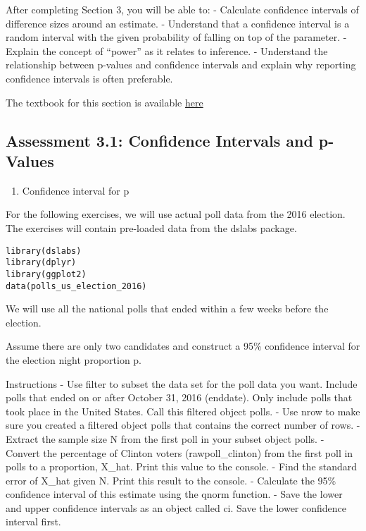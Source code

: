 \documentclass[
]{article}
\providecommand{\tightlist}{%
  \setlength{\itemsep}{0pt}\setlength{\parskip}{0pt}}
\begin{document}
After completing Section 3, you will be able to: - Calculate confidence
intervals of difference sizes around an estimate. - Understand that a
confidence interval is a random interval with the given probability of
falling on top of the parameter. - Explain the concept of ``power'' as
it relates to inference. - Understand the relationship between p-values
and confidence intervals and explain why reporting confidence intervals
is often preferable.

The textbook for this section is available
\href{https://rafalab.github.io/dsbook/inference.html\#confidence-intervals}{here}

\hypertarget{assessment-3.1-confidence-intervals-and-p-values}{%
\subsection{Assessment 3.1: Confidence Intervals and
p-Values}\label{assessment-3.1-confidence-intervals-and-p-values}}

\begin{enumerate}
\def\labelenumi{\arabic{enumi}.}
\tightlist
\item
  Confidence interval for p
\end{enumerate}

For the following exercises, we will use actual poll data from the 2016
election. The exercises will contain pre-loaded data from the dslabs
package.

\begin{verbatim}
library(dslabs)
library(dplyr)
library(ggplot2)
data(polls_us_election_2016)
\end{verbatim}

We will use all the national polls that ended within a few weeks before
the election.

Assume there are only two candidates and construct a 95\% confidence
interval for the election night proportion p.

Instructions - Use filter to subset the data set for the poll data you
want. Include polls that ended on or after October 31, 2016 (enddate).
Only include polls that took place in the United States. Call this
filtered object polls. - Use nrow to make sure you created a filtered
object polls that contains the correct number of rows. - Extract the
sample size N from the first poll in your subset object polls. - Convert
the percentage of Clinton voters (rawpoll\_clinton) from the first poll
in polls to a proportion, X\_hat. Print this value to the console. -
Find the standard error of X\_hat given N. Print this result to the
console. - Calculate the 95\% confidence interval of this estimate using
the qnorm function. - Save the lower and upper confidence intervals as
an object called ci. Save the lower confidence interval first.
\end{document}
